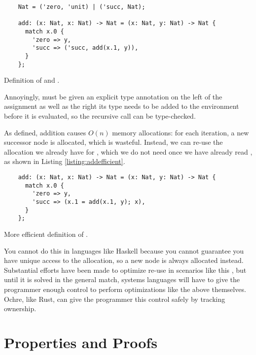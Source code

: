 \documentclass[12pt,twoside]{report}
\begin{document}
\begin{listing}
  \begin{verbatim}
    Nat = ('zero, 'unit) | ('succ, Nat);

    add: (x: Nat, x: Nat) -> Nat = (x: Nat, y: Nat) -> Nat {
      match x.0 {
        'zero => y,
        'succ => ('succ, add(x.1, y)),
      }
    };
  \end{verbatim}
  \caption{Definition of  and .}
  \label{listing:natadd}
\end{listing}

Annoyingly,  must be given an explicit type annotation on the left of the assignment as well as the right its type needs to be added to the environment before it is evaluated, so the recursive call can be type-checked.

As defined, addition causes $O(n)$ memory allocations: for each iteration, a new successor node is allocated, which is wasteful. Instead, we can re-use the allocation we already have for , which we do not need once we have already read , as shown in Listing \ref{listing:addefficient}.

\begin{listing}
  \begin{verbatim}
    add: (x: Nat, x: Nat) -> Nat = (x: Nat, y: Nat) -> Nat {
      match x.0 {
        'zero => y,
        'succ => (x.1 = add(x.1, y); x),
      }
    };
  \end{verbatim}
  \caption{More efficient definition of .}
  \label{listing:natadd}
\end{listing}

You cannot do this in languages like Haskell because you cannot guarantee you have unique access to the allocation, so a new node is always allocated instead. Substantial efforts have been made to optimize re-use in scenarios like this \citep{ningningPerceusGarbageFree2021}, but until it is solved in the general match, systems languages will have to give the programmer enough control to perform optimizations like the above themselves. Ochre, like Rust, can give the programmer this control safely by tracking ownership.


\section{Properties and Proofs}
\label{section:properties}
\end{document}

